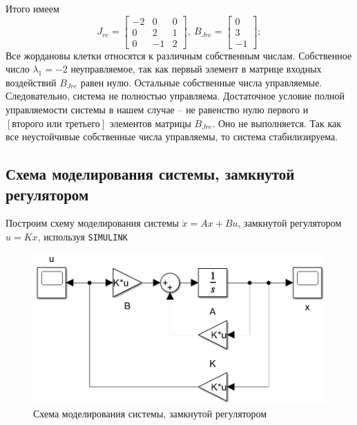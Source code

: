 \documentclass[a4paper, 12pt]{article}
\begin{document}
    Итого имеем
    $$
    J_{re}=\begin{bmatrix}
        -2     &0     &0\\
         0     &2     &1\\
         0    &-1     &2
        \end{bmatrix},\ B_{Jre}=\begin{bmatrix}
            0\\
         3\\
        -1
        \end{bmatrix};
    $$
    Все жордановы клетки относятся к различным собственным числам. Собственное число $\lambda_1=-2$ неуправляемое, так как первый элемент в матрице
    входных воздействий $B_{Jre}$ равен нулю. Остальные собственные числа управляемые.
    Следовательно, система не полностью управляема. Достаточное условие полной управляемости
    системы в нашем случае -- не равенство нулю первого и $\left[\text{второго или третьего}\right]$
    элементов матрицы $B_{Jre}$. Оно не выполняется. Так как все неустойчивые собственные числа
    управляемы, то система стабилизируема.


    \subsection{Схема моделирования системы, замкнутой регулятором}
    Построим схему моделирования системы $\dot{x}=Ax+Bu$, замкнутой регулятором $u=Kx$, используя \texttt{SIMULINK}
    \begin{figure}[H]
        \centering
        \includegraphics[scale=0.5]{scheme_task1.png}
        \captionsetup{skip=0pt}
        \caption{Схема моделирования системы, замкнутой регулятором}
        \label{fig:scheme_task1}
    \end{figure}
\end{document}
